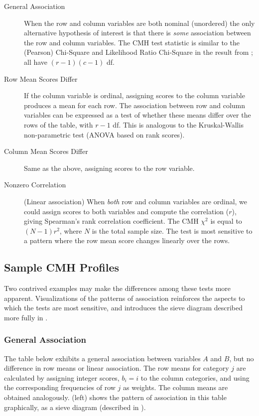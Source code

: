 \documentclass[10pt,krantz2]{krantz}\usepackage[]{graphicx}\usepackage[]{color}
\begin{document}
\begin{description}
\item[General Association]  When the row and column
       variables are both nominal (unordered) the only alternative
       hypothesis of interest is that there is \emph{some} association
       between the row and column variables.  The CMH test statistic
       is similar to the (Pearson) Chi-Square and Likelihood Ratio
       Chi-Square in the result from ; all have \((r - 1) (c -
       1)\) df.

\item[Row Mean Scores Differ]  If the column variable is
       ordinal, assigning scores to the column variable produces a
       mean for each row.  The association between row and column
       variables can be expressed as a test of whether these means
       differ over the rows of the table, with \(r - 1\) df.  This
       is analogous to the Kruskal-Wallis non-parametric test (ANOVA
       based on rank scores).
\item[Column Mean Scores Differ]  Same as the above, assigning scores to
  the row variable.

\item[Nonzero Correlation] (Linear association)  When \emph{both} row and
       column variables are ordinal, we could assign scores to both
       variables and compute the correlation ($r$), giving Spearman's
       rank correlation coefficient.  The CMH
       \(\chi^2\) is equal to \(( N - 1) r^2\), where $N$ is the total
       sample size.  The test is most sensitive to a pattern where
       the row mean score changes linearly over the rows.
\end{description}

\subsection{Sample CMH Profiles}\label{sec:Sample}

Two contrived examples may make the differences among these tests
more apparent.  Visualizations of the patterns of association
reinforces the aspects to which the tests are most sensitive,
and introduces the sieve diagram described more fully in .

\subsubsection{General Association}
The table below exhibits a
general association between variables $A$ and $B$, but no difference in
row means or linear association.  The row means for category $j$ are calculated by
assigning integer scores, $b_i = i$ to the column categories, and
using the corresponding frequencies of row $j$ as weights. The column
means are obtained analogously. 
 (left) shows
the pattern of association in this table graphically, as a sieve diagram
(described in ).
\end{document}
